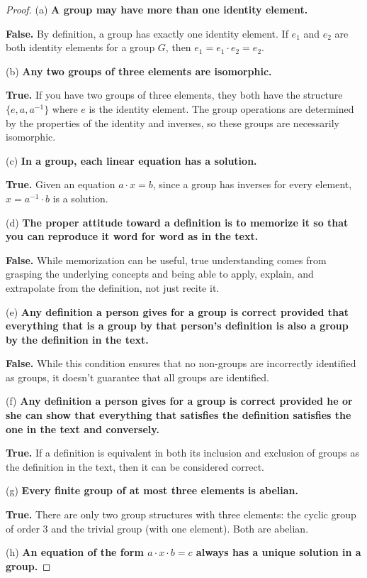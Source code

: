 \documentclass[12pt]{amsart}
\theoremstyle{definition}
\numberwithin{equation}{section}
\theoremstyle{plain}
\begin{document}
\begin{exercise}{25}
\begin{proof}
(a) \textbf{A group may have more than one identity element.}

\textbf{False.} By definition, a group has exactly one identity element. If \(e_1\) and \(e_2\) are both identity elements for a group \(G\), then \(e_1 = e_1 \cdot e_2 = e_2\).

(b) \textbf{Any two groups of three elements are isomorphic.}

\textbf{True.} If you have two groups of three elements, they both have the structure \(\{e, a, a^{-1}\}\) where \(e\) is the identity element. The group operations are determined by the properties of the identity and inverses, so these groups are necessarily isomorphic.

(c) \textbf{In a group, each linear equation has a solution.}

\textbf{True.} Given an equation \(a \cdot x = b\), since a group has inverses for every element, \(x = a^{-1} \cdot b\) is a solution. 

(d) \textbf{The proper attitude toward a definition is to memorize it so that you can reproduce it word for word as in the text.}

\textbf{False.} While memorization can be useful, true understanding comes from grasping the underlying concepts and being able to apply, explain, and extrapolate from the definition, not just recite it.

(e) \textbf{Any definition a person gives for a group is correct provided that everything that is a group by that person's definition is also a group by the definition in the text.}

\textbf{False.} While this condition ensures that no non-groups are incorrectly identified as groups, it doesn't guarantee that all groups are identified.

(f) \textbf{Any definition a person gives for a group is correct provided he or she can show that everything that satisfies the definition satisfies the one in the text and conversely.}

\textbf{True.} If a definition is equivalent in both its inclusion and exclusion of groups as the definition in the text, then it can be considered correct.

(g) \textbf{Every finite group of at most three elements is abelian.}

\textbf{True.} There are only two group structures with three elements: the cyclic group of order 3 and the trivial group (with one element). Both are abelian.

(h) \textbf{An equation of the form \(a \cdot x \cdot b = c\) always has a unique solution in a group.}


\end{proof}
\end{exercise}
\end{document}
